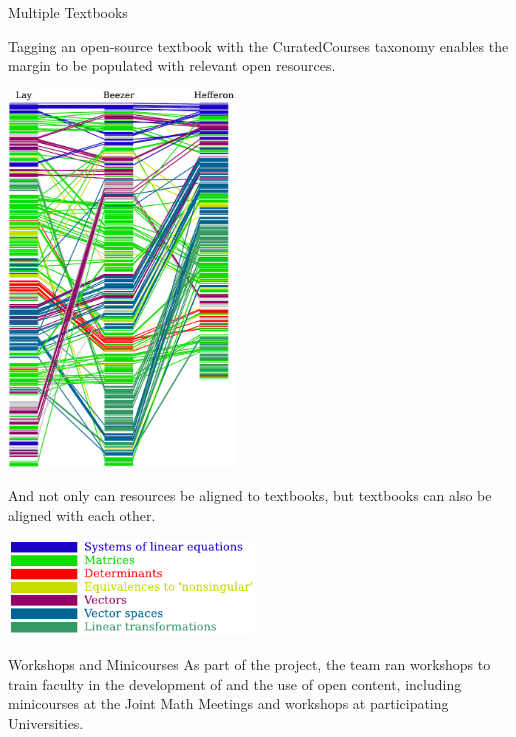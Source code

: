 \begin{sectionblock}{Multiple Textbooks}

  Tagging an open-source textbook with the
  CuratedCourses taxonomy enables the margin to be populated with relevant open
  resources.\vspace{1ex}
  
\vspace{-2ex}\parbox[t][][t]{0.49\textwidth}{\begin{center}\includegraphics[width=0.45\textwidth,valign=t]{alignment.pdf}\end{center}}\parbox[t][][t]{0.49\textwidth}{\begin{flushleft}And not only can resources be aligned to textbooks, but textbooks can also be aligned with each other.\end{flushleft}\vspace{1ex}\begin{center}\includegraphics[width=0.49\textwidth]{legend.pdf}\end{center}}


\end{sectionblock}

\vspace{1ex}

\begin{sectionblock}{Workshops and Minicourses}
  As part of the project, the team ran workshops to train
  faculty in the development of and the use of open content, including
  minicourses at the Joint Math Meetings and workshops at participating Universities.


\end{sectionblock}


